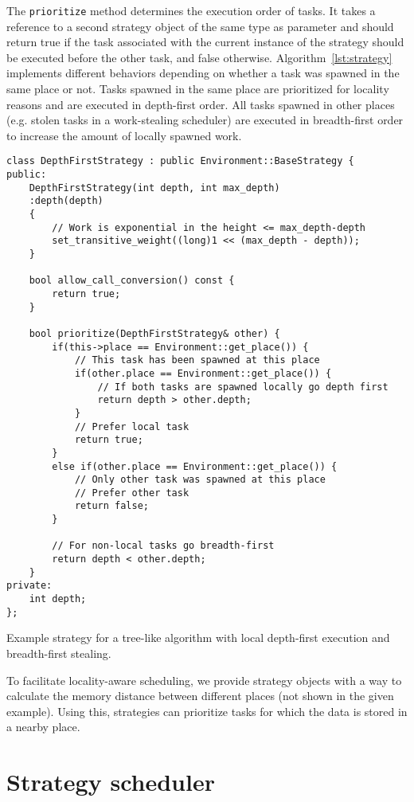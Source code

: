 \documentclass[a4paper,11pt]{article}
\begin{document}
The \texttt{prioritize} method determines the execution order of
tasks. It takes a reference to a second strategy object of the same
type as parameter and should return true if the task associated with
the current instance of the strategy should be executed before the
other task, and false otherwise. Algorithm~\ref{lst:strategy}
implements different behaviors depending on whether a task was spawned
in the same place or not. Tasks spawned in the same place are
prioritized for locality reasons and are executed in depth-first
order. All tasks spawned in other places (e.g. stolen tasks in a
work-stealing scheduler) are executed in breadth-first order to
increase the amount of locally spawned work.

\begin{algorithm}
\begin{lstlisting}[mathescape=true,columns=flexible,escapechar=^]
class DepthFirstStrategy : public Environment::BaseStrategy {
public:
	DepthFirstStrategy(int depth, int max_depth)
	:depth(depth)
	{ 	
		// Work is exponential in the height <= max_depth-depth
		set_transitive_weight((long)1 << (max_depth - depth));
	}

	bool allow_call_conversion() const {
		return true;
	}
	
	bool prioritize(DepthFirstStrategy& other) {
		if(this->place == Environment::get_place()) {
			// This task has been spawned at this place
			if(other.place == Environment::get_place()) {
				// If both tasks are spawned locally go depth first
				return depth > other.depth;
			}
			// Prefer local task
			return true;
		}
		else if(other.place == Environment::get_place()) {
			// Only other task was spawned at this place
			// Prefer other task
			return false;
		}
		
		// For non-local tasks go breadth-first
		return depth < other.depth;
	}
private:
	int depth;
};

\end{lstlisting}
\caption{Example strategy for a tree-like algorithm with local
  depth-first execution and breadth-first stealing.}
\label{lst:strategy}
\end{algorithm}

To facilitate locality-aware scheduling, we provide strategy objects
with a way to calculate the memory distance between different places
(not shown in the given example). Using this, strategies can
prioritize tasks for which the data is stored in a nearby place.

\section{Strategy scheduler}
\label{sec:sched}
\end{document}
